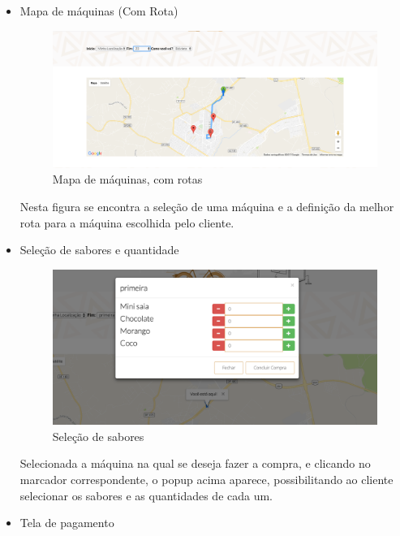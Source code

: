\begin{itemize}
\item{Mapa de máquinas (Com Rota)}

\begin{figure}[H]
	\centering
    \includegraphics[width=\textwidth]{figuras/rotas}
    \caption{Mapa de máquinas, com rotas}
    \label{fig:Mapa de máquinas, com rotas}
\end{figure}

Nesta figura se encontra a seleção de uma máquina e a definição da melhor rota para a máquina escolhida pelo cliente.


\item{Seleção de sabores e quantidade}

\begin{figure}[H]
	\centering
    \includegraphics[width=\textwidth]{figuras/quantidade}
    \caption{Seleção de sabores}
    \label{fig:Seleção de sabores}
\end{figure}

Selecionada a máquina na qual se deseja fazer a compra, e clicando no marcador correspondente, o popup acima aparece, possibilitando ao cliente selecionar os sabores e as quantidades de cada um.


\item{Tela de pagamento}


\end{itemize}
